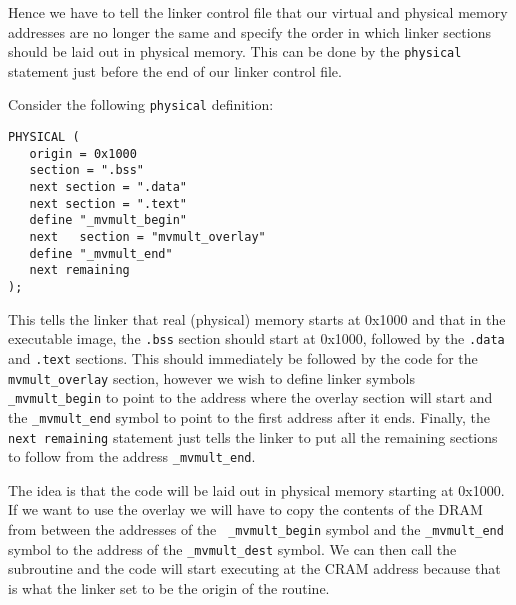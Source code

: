 Hence we have to tell the linker control file that our virtual and 
physical memory addresses are no longer the same and specify the order
in which linker sections should be laid out in physical memory. This 
can be done by the {\tt physical} statement just before the end of our
linker control file. 

Consider the following {\tt physical} definition:
\begin{verbatim}
PHYSICAL ( 
   origin = 0x1000
   section = ".bss"
   next section = ".data"
   next section = ".text"
   define "_mvmult_begin"
   next   section = "mvmult_overlay"
   define "_mvmult_end"
   next remaining
);
\end{verbatim}

This tells the linker that real (physical) memory starts at 0x1000
and that in the executable image, the {\tt .bss} section should start
at 0x1000, followed by the {\tt .data} and {\tt .text} sections. This
should immediately be followed by the code for the {\tt mvmult\_overlay}
section, however we wish to define linker symbols {\tt \_mvmult\_begin}
to point to the address where the overlay section will start and the 
{\tt \_mvmult\_end} symbol to point to the first address after it ends.
Finally, the {\tt next remaining} statement just tells the linker to 
put all the remaining sections to follow from the address {\tt \_mvmult\_end}.

The idea is that the code will be laid out in physical memory starting
at 0x1000. If we want to use the overlay we will have to copy the
contents of the DRAM from between the addresses of the {\tt
\_mvmult\_begin} symbol and the {\tt \_mvmult\_end} symbol to the
address of the {\tt \_mvmult\_dest} symbol. We can then call the 
subroutine and the code will start executing at the CRAM address because
that is what the linker set to be the origin of the routine.

